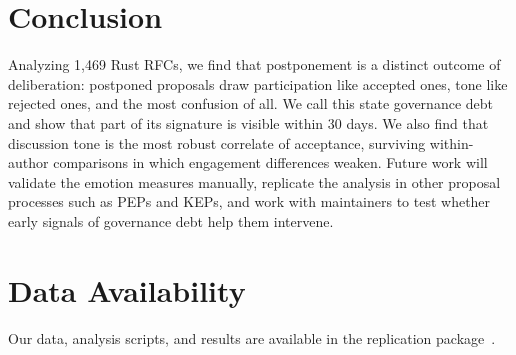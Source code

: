 \documentclass[conference]{IEEEtran}
\begin{document}
\section{Conclusion}
Analyzing 1,469 Rust RFCs, we find that postponement is a distinct outcome of deliberation: postponed proposals draw participation like accepted ones, tone like rejected ones, and the most confusion of all. We call this state governance debt and show that part of its signature is visible within 30 days. We also find that discussion tone is the most robust correlate of acceptance, surviving within-author comparisons in which engagement differences weaken. Future work will validate the emotion measures manually, replicate the analysis in other proposal processes such as PEPs and KEPs, and work with maintainers to test whether early signals of governance debt help them intervene.

\section*{Data Availability}
Our data, analysis scripts, and results are available in the replication package~\cite{rrgc2026}.


\end{document}
